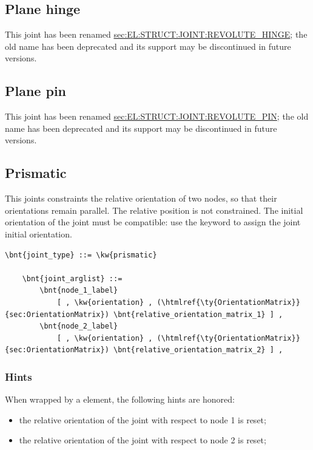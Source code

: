 \subsection{Plane hinge}
This joint has been renamed
\hyperref{\kw{revolute hinge}}{\kw{revolute hinge} (see Section~}{)}{sec:EL:STRUCT:JOINT:REVOLUTE_HINGE};
the old name has been deprecated and its support may be discontinued
in future versions.

\subsection{Plane pin}
This joint has been renamed
\hyperref{\kw{revolute pin}}{\kw{revolute pin} (see Section~}{)}{sec:EL:STRUCT:JOINT:REVOLUTE_PIN};
the old name has been deprecated and its support may be discontinued
in future versions.

\subsection{Prismatic}
This joints constraints the relative orientation of two nodes, so that
their orientations remain parallel.
The relative position is not constrained.
The initial orientation of the joint must be
compatible: use the  keyword to assign 
the joint initial orientation.
\begin{Verbatim}[commandchars=\\\{\}]
    \bnt{joint_type} ::= \kw{prismatic}

    \bnt{joint_arglist} ::= 
        \bnt{node_1_label}
            [ , \kw{orientation} , (\htmlref{\ty{OrientationMatrix}}{sec:OrientationMatrix}) \bnt{relative_orientation_matrix_1} ] ,
        \bnt{node_2_label}
            [ , \kw{orientation} , (\htmlref{\ty{OrientationMatrix}}{sec:OrientationMatrix}) \bnt{relative_orientation_matrix_2} ] ,
\end{Verbatim}

\subsubsection{Hints}
When wrapped by a  element, the following hints are honored:
\begin{itemize}
\item {} the relative orientation of the joint
with respect to node 1 is reset;
\item {} the relative orientation of the joint
with respect to node 2 is reset;
\end{itemize}

